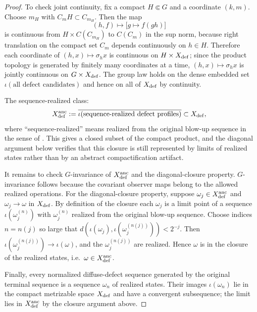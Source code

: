 \documentclass[11pt]{amsart}
\numberwithin{equation}{section}
\theoremstyle{plain}
\theoremstyle{definition}
\theoremstyle{remark}
\begin{document}
\begin{proof}
To check joint continuity, fix a compact \(H\Subset G\) and a coordinate
\((k,m)\).  Choose \(m_H\) with \(C_mH\subset C_{m_H}\).  Then the map
\[
   (h,f)\longmapsto \bigl[g\mapsto f(gh)\bigr]
\]
is continuous from \(H\times C(C_{m_H})\) to \(C(C_m)\) in the sup norm,
because right translation on the compact set \(C_m\) depends continuously on
\(h\in H\).  Therefore each coordinate of \((h,x)\mapsto\sigma_hx\) is
continuous on \(H\times X_{\rm def}\); since the product topology is generated by
finitely many coordinates at a time, \((h,x)\mapsto\sigma_hx\) is jointly
continuous on \(G\times X_{\rm def}\).  The group law holds on the dense
embedded set \(\iota(\text{all defect candidates})\) and hence on all of
\(X_{\rm def}\) by continuity.

The sequence-realized class:
\[
   X_{\rm def}^{\rm anc}
   :=
   \overline{\iota(\text{sequence-realized defect profiles})}
   \subset X_{\rm def} ,
\]
where ``sequence-realized'' means realized from the original blow-up
sequence in the sense of
.  This gives a closed subset of
the compact product, and the diagonal argument below verifies that this closure
is still represented by limits of realized states rather than by an abstract
compactification artifact.

It remains to check \(G\)-invariance of \(X_{\rm def}^{\rm anc}\) and the
diagonal-closure property.  \(G\)-invariance follows because the covariant
observer maps belong to the allowed realized operations.  For the
diagonal-closure property, suppose \(\omega_j\in X_{\rm def}^{\rm anc}\) and
\(\omega_j\to\omega\) in \(X_{\rm def}\).  By definition of the closure each
\(\omega_j\) is a limit point of a sequence \(\iota(\omega_j^{(n)})\) with
\(\omega_j^{(n)}\) realized from the original blow-up sequence.  Choose
indices \(n=n(j)\) so large that \(d(\iota(\omega_j),\iota(\omega_j^{(n(j))}))
<2^{-j}\).  Then \(\iota(\omega_j^{(n(j))})\to\iota(\omega)\), and the
\(\omega_j^{(n(j))}\) are realized.  Hence \(\omega\) is in the closure of
the realized states, i.e.\ \(\omega\in X_{\rm def}^{\rm anc}\).

Finally, every normalized diffuse-defect sequence generated by the original
terminal sequence is a sequence \(\omega_n\) of realized states.  Their
images \(\iota(\omega_n)\) lie in the compact metrizable space
\(X_{\rm def}\) and have a convergent subsequence; the limit lies in
\(X_{\rm def}^{\rm anc}\) by the closure argument above.
\end{proof}
\end{document}

